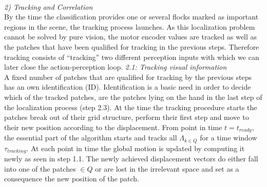 %
%
\\ \newline
%
%
\textit{2) Tracking and Correlation}\\ \newline
By the time the classification provides one or several flocks marked as important regions in the scene, the tracking process launches.%
As this localization problem cannot be solved by pure vision, the motor encoder values are tracked as well as the patches that have been qualified for tracking in the previous steps. Therefore tracking consists of ``tracking'' two different perception inputs with which we can later close the action-perception loop.
%
\textit{2.1: Tracking visual information} \\ \newline
A fixed number of patches that are qualified for tracking by the previous steps has an own identification (ID). Identification is a basic need in order to decide which of the tracked patches, are the patches lying on the hand in the last step of the localization process (step 2.3). At the time the tracking procedure starts the patches break out of their grid structure, perform their first step and move to their new position according to the displacement. From point in time $t=t_{ready}$, the essential part of the algorithm starts and tracks all $\Lambda_{k \in Q} $ for a time window $\tau_{tracking}$. At each point in time the global motion is updated by computing it newly as seen in step 1.1. The newly achieved displacement vectors do either fall into one of the patches $\in Q$ or are lost in the irrelevant space and set as a consequence the new position of the patch. \\
